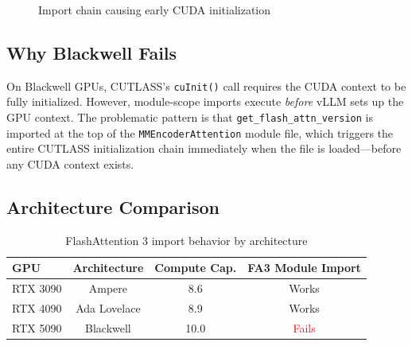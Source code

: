 \documentclass[10pt,letterpaper]{article}
\begin{document}
\begin{figure}[H]
\centering
{}
\caption{Import chain causing early CUDA initialization}
\end{figure}

\subsection{Why Blackwell Fails}

On Blackwell GPUs, CUTLASS's \texttt{cuInit()} call requires the CUDA context to be fully initialized. However, module-scope imports execute \textit{before} vLLM sets up the GPU context. The problematic pattern is that \texttt{get\_flash\_attn\_version} is imported at the top of the \texttt{MMEncoderAttention} module file, which triggers the entire CUTLASS initialization chain immediately when the file is loaded---before any CUDA context exists.

\subsection{Architecture Comparison}

\begin{table}[H]
\centering
\small
\begin{tabular}{@{}lccc@{}}
\toprule
\textbf{GPU} & \textbf{Architecture} & \textbf{Compute Cap.} & \textbf{FA3 Module Import} \\
\midrule
RTX 3090 & Ampere & 8.6 & Works \\
RTX 4090 & Ada Lovelace & 8.9 & Works \\
RTX 5090 & Blackwell & 10.0 & \textcolor{red}{Fails} \\
\bottomrule
\end{tabular}
\caption{FlashAttention 3 import behavior by architecture}
\end{table}
\end{document}
